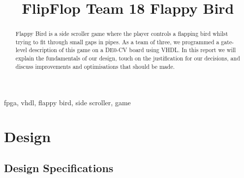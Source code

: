 \documentclass[conference]{IEEEtran}
\begin{document}
\title{FlipFlop Team 18 Flappy Bird}

\author{
    \and
    \and
}

\maketitle

\begin{abstract}
    Flappy Bird is a side scroller game where the player controls a flapping bird whilst trying to fit through small gaps in pipes. As a team of three, we programmed a gate-level description of this game on a DE0-CV board using VHDL. In this report we will explain the fundamentals of our design, touch on the justification for our decisions, and discuss improvements and optimisations that should be made.
\end{abstract}

\begin{IEEEkeywords}
    fpga, vhdl, flappy bird, side scroller, game
\end{IEEEkeywords}

\section{Design}

\subsection{Design Specifications}
\end{document}
